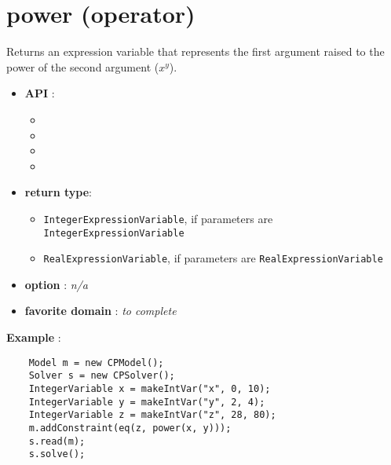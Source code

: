 \label{power}
\hypertarget{power}{}

\section{power (operator)}\label{power:poweroperator}\hypertarget{power:poweroperator}{}
Returns an expression variable that represents the first argument raised to the power of the second argument (\(x^y\)).

\begin{itemize}
	\item \textbf{API} :
	\begin{itemize}
		\item {}
		\item {}
		\item {}
		\item {}
	\end{itemize}
	\item \textbf{return type}:
	\begin{itemize}
		\item \texttt{IntegerExpressionVariable}, if parameters are \texttt{IntegerExpressionVariable}
		\item \texttt{RealExpressionVariable}, if parameters are \texttt{RealExpressionVariable}
	\end{itemize}
	\item \textbf{option} : \emph{n/a}
	\item \textbf{favorite domain} : \emph{to complete}
\end{itemize}

\textbf{Example} : 
\begin{lstlisting}
	Model m = new CPModel();
	Solver s = new CPSolver();
	IntegerVariable x = makeIntVar("x", 0, 10);
	IntegerVariable y = makeIntVar("y", 2, 4);
	IntegerVariable z = makeIntVar("z", 28, 80);
	m.addConstraint(eq(z, power(x, y)));
	s.read(m);
	s.solve();
\end{lstlisting}

